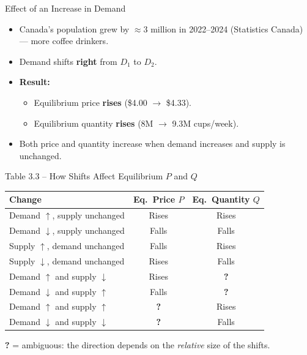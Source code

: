 \documentclass[aspectratio=169]{beamer}
\begin{document}
\begin{frame}{Effect of an Increase in Demand}
\transfade
\begin{itemize}[<+->]
  \item Canada's population grew by $\approx$3 million in 2022--2024 (Statistics Canada) --- more coffee drinkers.
  \item Demand shifts \textbf{right} from $D_1$ to $D_2$.
  \item \textbf{Result:}
  \begin{itemize}[<+->]
    \item Equilibrium price \textbf{rises} (\$4.00 $\to$ \$4.33).
    \item Equilibrium quantity \textbf{rises} (8M $\to$ 9.3M cups/week).
  \end{itemize}
  \item Both price and quantity increase when demand increases and supply is unchanged.
\end{itemize}
\end{frame}

\begin{frame}{Table 3.3 -- How Shifts Affect Equilibrium $P$ and $Q$}
\begin{center}
\renewcommand{\arraystretch}{1.5}
\begin{tabular}{lcc}
\toprule
\textbf{Change} & \textbf{Eq.\ Price $P$} & \textbf{Eq.\ Quantity $Q$} \\
\midrule
Demand $\uparrow$, supply unchanged & \textcolor{leafgreen}{Rises} & \textcolor{leafgreen}{Rises} \\
Demand $\downarrow$, supply unchanged & \textcolor{canadared}{Falls} & \textcolor{canadared}{Falls} \\
Supply $\uparrow$, demand unchanged & \textcolor{canadared}{Falls} & \textcolor{leafgreen}{Rises} \\
Supply $\downarrow$, demand unchanged & \textcolor{leafgreen}{Rises} & \textcolor{canadared}{Falls} \\
\midrule
Demand $\uparrow$ and supply $\downarrow$ & \textcolor{leafgreen}{Rises} & \textbf{?} \\
Demand $\downarrow$ and supply $\uparrow$ & \textcolor{canadared}{Falls} & \textbf{?} \\
Demand $\uparrow$ and supply $\uparrow$ & \textbf{?} & \textcolor{leafgreen}{Rises} \\
Demand $\downarrow$ and supply $\downarrow$ & \textbf{?} & \textcolor{canadared}{Falls} \\
\bottomrule
\end{tabular}
\end{center}
\vspace{0.3em}
{\small \textbf{?} = ambiguous: the direction depends on the \emph{relative} size of the shifts.}
\end{frame}
\end{document}
